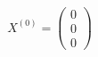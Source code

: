 \documentclass[preview]{standalone}
\begin{document}
\begin{align*}
X^{(0)} = \begin{pmatrix} 0 \\ 0 \\ 0 \end{pmatrix}
\end{align*}
\end{document}
